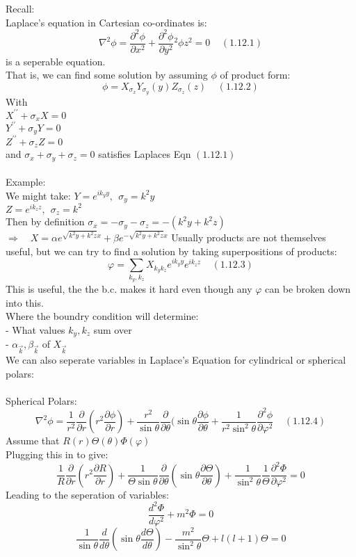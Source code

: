 \documentclass[a4paper,11pt]{article}
\newcommand{\pd}[2]{\dfrac{\partial #1}{\partial #2}}
\newcommand{\od}[2]{\dfrac{d #1}{d #2}}
\begin{document}
Recall:\\
Laplace's equation in Cartesian co-ordinates is:
$$\nabla^2\phi=\pd{^2\phi}{x^2}+\pd{^2\phi}{y^2}{^2\phi}{z^2}=0~~~~~(1.12.1)$$
is a seperable equation.\\
That is, we can find some solution by assuming $\phi$ of product form:
$$\phi=X_{\sigma_x}Y_{\sigma_y}(y)Z_{\sigma_z}(z)~~~~~(1.12.2)$$
With\\
$X^{\prime\prime}+\sigma_xX=0$\\
$Y^{\prime\prime}+\sigma_yY=0$\\
$Z^{\prime\prime}+\sigma_zZ=0$\\
and $\sigma_x+\sigma_y+\sigma_z=0$ satisfies Laplaces Eqn $(1.12.1)$\\
\\
Example:\\
We might take:
$Y=e^{ik_y y},~~\sigma_y=k^2y$\\
$Z=e^{ik_z z},~~\sigma_z=k^2$\\
Then by definition $\sigma_x=-\sigma_y-\sigma_z=-(k^2y+k^2z)$\\
$\Rightarrow$~~$X=\alpha e^{\sqrt{k^2 y+k^2z}x}+\beta e^{-\sqrt{k^2y+k^2z}x}$
Usually products are not themselves useful, but we can try to find a solution by taking superpositions of products:
$$\varphi=\sum_{k_y,k_z}X_{k_yk_z}e^{ik_yy}e^{ik_zz}~~~~~(1.12.3)$$
This is useful, the the b.c. makes it hard even though any $\varphi$ can be broken down into this.\\
Where the boundry condition will determine:\\
- What values $k_y,k_z$ sum over\\
- $\alpha_{\vec{k}},\beta_{\vec{k}}$ of $X_{\vec{k}}$\\
We can also seperate variables in Laplace's Equation for cylindrical or spherical polars:\\
\\
Spherical Polars:
$$\nabla^2\phi=\frac{1}{r^2}\pd{}{r}(r^2\pd{\phi}{r})+\dfrac{r^2}{\sin\theta}\pd{}{\theta}(\sin\theta\pd{\phi}{\theta}+\dfrac{1}{r^2\sin^2\theta}\pd{^2\phi}{\varphi^2}~~~~~(1.12.4)$$
Assume that $R(r)\Theta(\theta)\Phi(\varphi)$\\
Plugging this in to give:
$$\frac{1}{R}\pd{}{r}(r^2\pd{R}{r})+\dfrac{1}{\Theta\sin\theta}\pd{}{\theta}(\sin\theta\pd{\Theta}{\theta})+\dfrac{1}{\sin^2\theta}\dfrac{1}{\Theta}\pd{^2\Phi}{\varphi^2}=0$$
Leading to the seperation of variables:
$$\od{^2\Phi}{\varphi^2}+m^2\Phi=0$$
$$\dfrac{1}{\sin\theta}\od{}{\theta}(\sin\theta\od{\Theta}{\theta})-\dfrac{m^2}{\sin^2\theta}\Theta+l(l+1)\Theta=0$$
\end{document}
